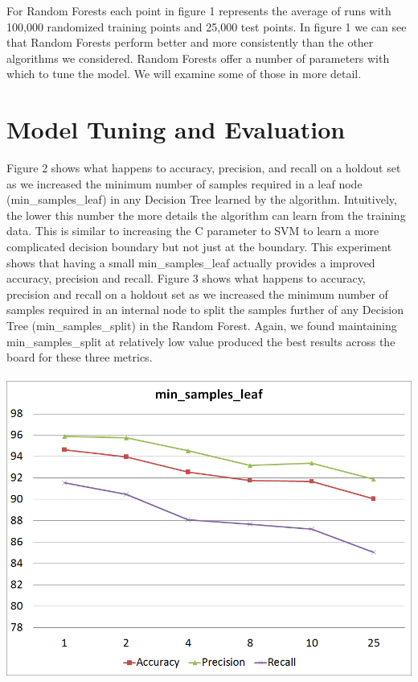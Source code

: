 \documentclass[twoside,11pt]{homework}
\begin{document}
For Random Forests each point in figure 1 represents the average of runs with 100,000 randomized 
training points and 25,000 test points. In figure 1 we can see that Random Forests perform better and more
consistently than the other algorithms we considered. Random Forests offer a number of parameters with which 
to tune the model. We will examine some of those in more detail. 

\section*{Model Tuning and Evaluation}

Figure 2 shows what happens to accuracy, precision, 
and recall on a holdout set as we increased the minimum number of samples required in a leaf node (min\_samples\_leaf) in any 
Decision Tree learned by the algorithm. Intuitively, the lower this number the more details the algorithm can learn 
from the training data. This is similar to increasing the C parameter to SVM to learn a more complicated decision boundary
but not just at the boundary.
This experiment shows that having a small min\_samples\_leaf actually provides a improved accuracy, precision and recall.
Figure 3 shows what happens to accuracy, precision and recall on a holdout set as we increased the minimum number of
samples required in an internal node to split the samples further of any Decision Tree (min\_samples\_split) in the Random Forest.
Again, we found maintaining min\_samples\_split at relatively low value produced the best results across the board for these three metrics.
\\
\\
\includegraphics[scale=0.5]{min_leaf.png}
\end{document}
